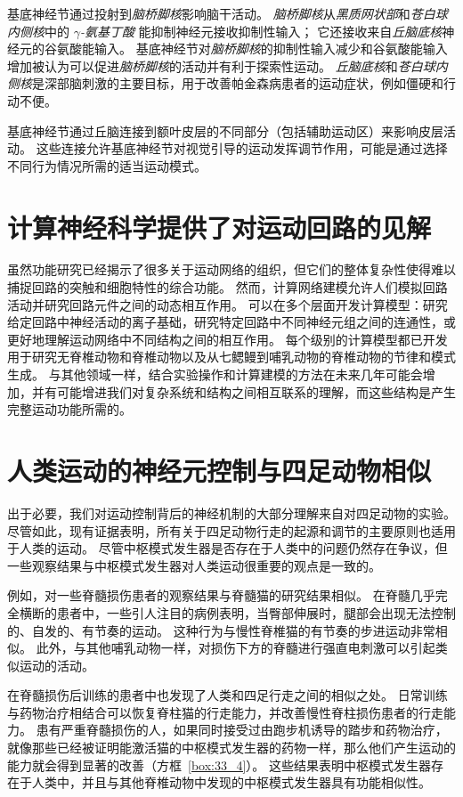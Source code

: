 基底神经节通过投射到\textit{脑桥脚核}影响脑干活动。
\textit{脑桥脚核}从\textit{黑质网状部}和\textit{苍白球内侧核}中的 \textit{$\gamma$-氨基丁酸} 能抑制神经元接收抑制性输入；
它还接收来自\textit{丘脑底核}神经元的谷氨酸能输入。
基底神经节对\textit{脑桥脚核}的抑制性输入减少和谷氨酸能输入增加被认为可以促进\textit{脑桥脚核}的活动并有利于探索性运动。
\textit{丘脑底核}和\textit{苍白球内侧核}是深部脑刺激的主要目标，用于改善帕金森病患者的运动症状，例如僵硬和行动不便。


基底神经节通过丘脑连接到额叶皮层的不同部分（包括辅助运动区）来影响皮层活动。
这些连接允许基底神经节对视觉引导的运动发挥调节作用，可能是通过选择不同行为情况所需的适当运动模式。



\section{计算神经科学提供了对运动回路的见解}

虽然功能研究已经揭示了很多关于运动网络的组织，但它们的整体复杂性使得难以捕捉回路的突触和细胞特性的综合功能。
然而，计算网络建模允许人们模拟回路活动并研究回路元件之间的动态相互作用。
可以在多个层面开发计算模型：研究给定回路中神经活动的离子基础，研究特定回路中不同神经元组之间的连通性，或更好地理解运动网络中不同结构之间的相互作用。
每个级别的计算模型都已开发用于研究无脊椎动物和脊椎动物以及从七鳃鳗到哺乳动物的脊椎动物的节律和模式生成。
与其他领域一样，结合实验操作和计算建模的方法在未来几年可能会增加，并有可能增进我们对复杂系统和结构之间相互联系的理解，而这些结构是产生完整运动功能所需的。


\section{人类运动的神经元控制与四足动物相似}

出于必要，我们对运动控制背后的神经机制的大部分理解来自对四足动物的实验。
尽管如此，现有证据表明，所有关于四足动物行走的起源和调节的主要原则也适用于人类的运动。
尽管中枢模式发生器是否存在于人类中的问题仍然存在争议，但一些观察结果与中枢模式发生器对人类运动很重要的观点是一致的。


例如，对一些脊髓损伤患者的观察结果与脊髓猫的研究结果相似。
在脊髓几乎完全横断的患者中，一些引人注目的病例表明，当臀部伸展时，腿部会出现无法控制的、自发的、有节奏的运动。
这种行为与慢性脊椎猫的有节奏的步进运动非常相似。
此外，与其他哺乳动物一样，对损伤下方的脊髓进行强直电刺激可以引起类似运动的活动。


在脊髓损伤后训练的患者中也发现了人类和四足行走之间的相似之处。
日常训练与药物治疗相结合可以恢复脊柱猫的行走能力，并改善慢性脊柱损伤患者的行走能力。
患有严重脊髓损伤的人，如果同时接受过由跑步机诱导的踏步和药物治疗，就像那些已经被证明能激活猫的中枢模式发生器的药物一样，那么他们产生运动的能力就会得到显著的改善（方框~\ref{box:33_4}）。
这些结果表明中枢模式发生器存在于人类中，并且与其他脊椎动物中发现的中枢模式发生器具有功能相似性。



